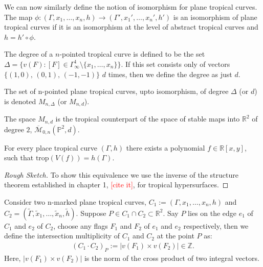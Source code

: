 We can now similarly define the notion of isomorphism for plane tropical curves. 
The map $\phi: (\Gamma, x_{1}, \dots, x_{n}, h) \to (\Gamma', x_{1}', \dots, x_{n}', h')$ is an isomorphism of plane tropical curves if it is an isomorphism at the level of abstract tropical curves and $h = h' \circ \phi$.

\begin{definition}
    The degree of a $n$-pointed tropical curve is defined to be the set $\Delta = \{v(F):[F] \in \Gamma^{1}_{\infty} \setminus \{x_{1}, \dots,x_{n} \} \}$.
    If this set consists only of vectors $\{(1,0),\,(0,1),\,(-1,-1)\}$ $d$ times, then we define the degree as just $d$.
    \par The set of n-pointed plane tropical curves, upto isomorphism, of degree $\Delta$ (or $d$) is denoted $M_{n, \Delta}$ (or $M_{n,d}$).
\end{definition}

The space $M_{n,d}$ is the tropical counterpart of the space of stable maps into $\mathbb{R}^{2}$ of degree $2$, $\overline{\mathcal{M}}_{0,n}(\mathbb{P}^{2},d)$.

\begin{proposition}
    For every place tropical curve $(\Gamma,h)$ there exists a polynomial $f \in \mathbb{R}[x,y]$, such that $\text{trop}(V(f)) = h (\Gamma)$.
\end{proposition}
\begin{proof}[Rough Sketch]
    To show this equivalence we use the inverse of the structure theorem established in chapter 1, \textcolor{red}{[cite it]}, for tropical hypersurfaces.
\end{proof}

\begin{definition}
    Consider two n-marked plane tropical curves, $C_{1}:=(\Gamma, x_{1}, \dots, x_{n}, h)$ and $C_{2} = (\tilde\Gamma, \tilde{x}_{1}, \dots, \tilde{x}_{n}, \tilde h)$.
    Suppose $P \in C_{1} \cap C_{2} \subset \mathbb{R}^{2}$. 
    Say $P$ lies on the edge $e_{1}$ of $C_{1}$ and $e_{2}$ of $C_{2}$, choose any flags $F_{1}$ and $F_{2}$ of $e_{1}$ and $e_{2}$ respectively, then we define the intersection multiplicity of $C_{1}$ and $C_{2}$ at the point $P$ as:
    \begin{align*}
        (C_{1}\cdot C_{2})_{P} :=  |v(F_{1}) \times v(F_{2})| \in \mathbb{Z}.
    \end{align*}
    Here, $|v(F_{1}) \times v(F_{2})|$ is the norm of the cross product of two integral vectors.
\end{definition}

